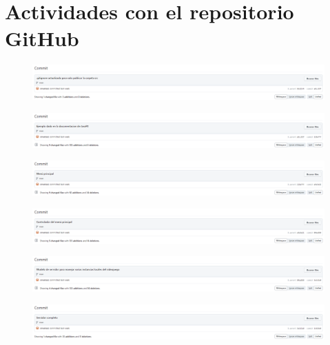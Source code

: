 \documentclass{article}
\begin{document}
\section{Actividades con el repositorio GitHub}

\begin{figure}[H]
	\centering
	\includegraphics[width=1\textwidth,keepaspectratio]{img/commit_01.png}
\end{figure}
\begin{figure}[H]
	\centering
	\includegraphics[width=1\textwidth,keepaspectratio]{img/commit_02.png}
\end{figure}
\begin{figure}[H]
	\centering
	\includegraphics[width=1\textwidth,keepaspectratio]{img/commit_03.png}
\end{figure}
\begin{figure}[H]
	\centering
	\includegraphics[width=1\textwidth,keepaspectratio]{img/commit_04.png}
\end{figure}
\begin{figure}[H]
	\centering
	\includegraphics[width=1\textwidth,keepaspectratio]{img/commit_05.png}
\end{figure}
\begin{figure}[H]
	\centering
	\includegraphics[width=1\textwidth,keepaspectratio]{img/commit_06.png}
\end{figure}
\end{document}
